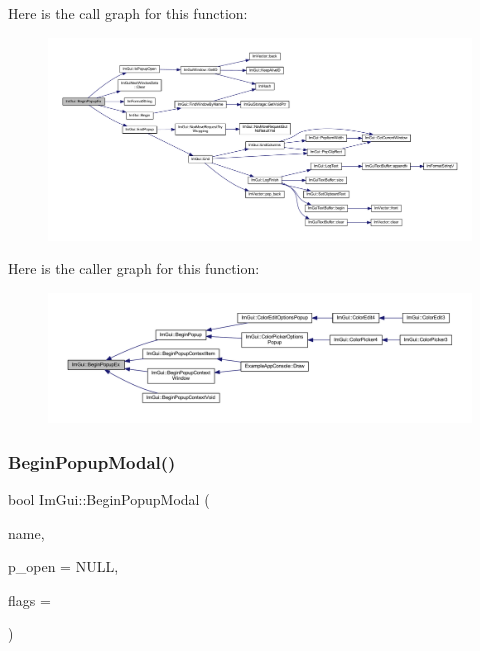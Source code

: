 Here is the call graph for this function\+:
\nopagebreak
\begin{figure}[H]
\begin{center}
\leavevmode
\includegraphics[width=350pt]{namespace_im_gui_a89da3a22300e8293257b6cfdf1b83b7a_cgraph}
\end{center}
\end{figure}
Here is the caller graph for this function\+:
\nopagebreak
\begin{figure}[H]
\begin{center}
\leavevmode
\includegraphics[width=350pt]{namespace_im_gui_a89da3a22300e8293257b6cfdf1b83b7a_icgraph}
\end{center}
\end{figure}
\mbox{\label{namespace_im_gui_a6d840f615c198c2342968f733fda11b3}} 
\subsubsection{\texorpdfstring{Begin\+Popup\+Modal()}{BeginPopupModal()}}
{\footnotesize\ttfamily bool Im\+Gui\+::\+Begin\+Popup\+Modal (\begin{DoxyParamCaption}\item[{const char $\ast$}]{name,  }\item[{bool $\ast$}]{p\+\_\+open = {\ttfamily NULL},  }\item[{\mbox{\hyperlink{imgui_8h_a0b8e067ab4f7a818828c8d89e531addc}{Im\+Gui\+Window\+Flags}}}]{flags = {} }\end{DoxyParamCaption})}

